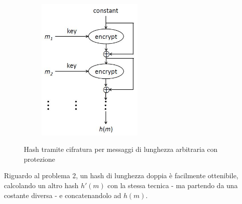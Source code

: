 \begin{figure}
	\begin{center}
	{\includegraphics[height=7cm, width=7cm, keepaspectratio]{Immagini/hash/schema_des_come_hash_2.JPG}}
	\caption{Hash tramite cifratura per messaggi di lunghezza arbitraria con protezione\label{fig:hash_lung_ar_2}}
	\end{center}
\end{figure}
\newline \newline
Riguardo al problema 2, un hash di lunghezza doppia è facilmente ottenibile, calcolando un altro hash $h'(m)$ con la stessa tecnica - ma partendo da una costante diversa - e concatenandolo ad $h(m)$.